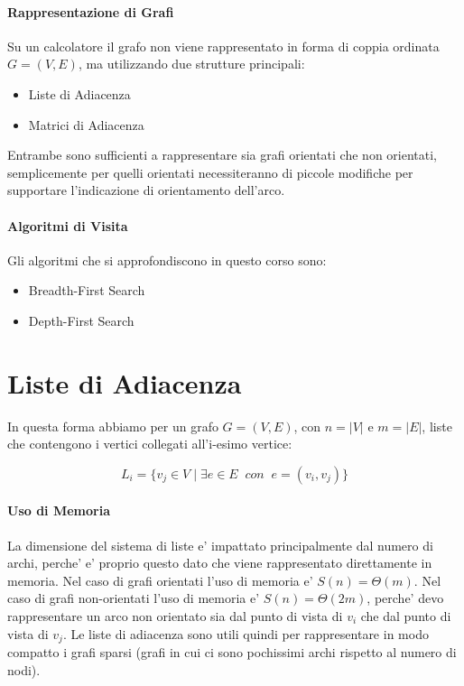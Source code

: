 \paragraph{Rappresentazione di Grafi}

Su un calcolatore il grafo non viene rappresentato in forma di coppia ordinata $G = (V, E)$, ma utilizzando due strutture principali:

\begin{itemize}
    \item Liste di Adiacenza
    \item Matrici di Adiacenza
\end{itemize}

Entrambe sono sufficienti a rappresentare sia grafi orientati che non orientati, semplicemente per quelli orientati necessiteranno di piccole modifiche per supportare l'indicazione di orientamento dell'arco.

\paragraph{Algoritmi di Visita}

Gli algoritmi che si approfondiscono in questo corso sono:

\begin{itemize}
    \item Breadth-First Search
    \item Depth-First Search
\end{itemize}

\section{Liste di Adiacenza}

In questa forma abbiamo per un grafo $G = (V, E)$, con $n = |V|$ e $m = |E|$, liste che contengono i vertici collegati all'i-esimo vertice:

\[
    L_{i} = \{ v_{j} \in V \mid \exists e \in E \;\; con \;\; e = (v_{i}, v_{j}) \}
\]

\paragraph{Uso di Memoria}

La dimensione del sistema di liste e' impattato principalmente dal numero di archi, perche' e' proprio questo dato che viene rappresentato direttamente in memoria.
Nel caso di grafi orientati l'uso di memoria e' $S(n) = \Theta(m)$.
Nel caso di grafi non-orientati l'uso di memoria e' $S(n) = \Theta(2m)$, perche' devo rappresentare un arco non orientato sia dal punto di vista di $v_{i}$ che dal punto di vista di $v_{j}$.
Le liste di adiacenza sono utili quindi per rappresentare in modo compatto i grafi sparsi (grafi in cui ci sono pochissimi archi rispetto al numero di nodi).

